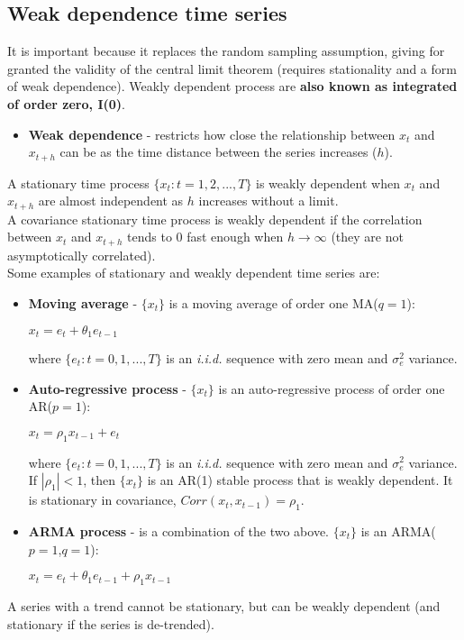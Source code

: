 \documentclass[10pt, a4paper, landscape]{extarticle}
\begin{document}
\begin{multicols}{3}
	\subsection*{Weak dependence time series}
		It is important because it replaces the random sampling assumption, giving for granted the validity of the central limit theorem (requires stationality and a form of weak dependence). Weakly dependent process are \textbf{also known as integrated of order zero, I(0)}.
		\begin{itemize}[leftmargin=*]
			\item \textbf{Weak dependence} - restricts how close the relationship between $x_t$ and $x_{t+h}$ can be as the time distance between the series increases ($h$).
		\end{itemize}
		A stationary time process $\lbrace x_t: t = 1, 2, ..., T \rbrace$ is weakly dependent when $x_t$ and $x_{t+h}$ are almost independent as $h$ increases without a limit.
		\\ A covariance stationary time process is weakly dependent if the correlation between $x_t$ and $x_{t+h}$ tends to $0$ fast enough when $h \rightarrow \infty$ (they are not asymptotically correlated).
		\\ Some examples of stationary and weakly dependent time series are:
		\begin{itemize}[leftmargin=*]
			\item \textbf{Moving average} - $\lbrace x_t \rbrace$ is a moving average of order one MA($q=1$):
			\begin{center}
				$x_t = e_t + \theta_1 e_{t-1}$
			\end{center}
			where $\lbrace e_t: t = 0, 1, ..., T \rbrace$ is an \textsl{i.i.d.} sequence with zero mean and $\sigma^2_e$ variance.
			\item \textbf{Auto-regressive process} - $\lbrace x_t \rbrace$ is an auto-regressive process of order one AR($p=1$):
			\begin{center}
				$x_t = \rho_1 x_{t-1} + e_t$
			\end{center}
			where $\lbrace e_t: t = 0, 1, ..., T \rbrace$ is an \textsl{i.i.d.} sequence with zero mean and $\sigma^2_e$ variance.
			\\ If $|\rho_1|<1$, then $\lbrace x_t \rbrace$ is an AR(1) stable process that is weakly dependent. It is stationary in covariance, $Corr(x_t, x_{t-1}) = \rho_1$.
			\item \textbf{ARMA process} - is a combination of the two above. $\lbrace x_t \rbrace$ is an ARMA($p=1$,$q=1$):
			\begin{center}
				$x_t = e_t + \theta_1 e_{t-1} + \rho_1 x_{t-1}$
			\end{center}
		\end{itemize}
		A series with a trend cannot be stationary, but can be weakly dependent (and stationary if the series is de-trended).


\end{multicols}
\end{document}
